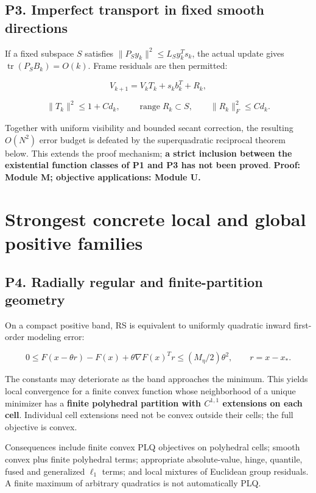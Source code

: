 \documentclass[10pt,oneside,openany]{book}
\theoremstyle{remark}\newtheorem{remark}{Remark}[chapter]
\begin{document}
\subsection{P3. Imperfect transport in fixed smooth directions}\label{p3.-imperfect-transport-in-fixed-smooth-directions}

If a fixed subspace \(S\) satisfies \(\|P_Sy_k\|^2\le L_Sy_k^Ts_k\), the actual update gives \(\operatorname{tr}(P_SB_k)=O(k)\). Frame residuals are then permitted:

\[V_{k+1}=V_kT_k+s_kb_k^T+R_k,\]

\[\|T_k\|^2\le1+Cd_k,\qquad \operatorname{range}R_k\subset S,
\qquad\|R_k\|_F^2\le Cd_k.\]

Together with uniform visibility and bounded secant correction, the resulting \(O(N^2)\) error budget is defeated by the superquadratic reciprocal theorem below. This extends the proof mechanism; \textbf{a strict inclusion between the existential function classes of P1 and P3 has not been proved}. \textbf{Proof: Module M; objective applications: Module U.}

\section{Strongest concrete local and global positive families}\label{strongest-concrete-local-and-global-positive-families}

\subsection{P4. Radially regular and finite-partition geometry}\label{p4.-radially-regular-and-finite-partition-geometry}

On a compact positive band, RS is equivalent to uniformly quadratic inward first-order modeling error:

\[
 0\le F(x-\theta r)-F(x)+\theta\nabla F(x)^Tr
 \le(M_\eta/2)\theta^2,\qquad r=x-x_*.
\]

The constants may deteriorate as the band approaches the minimum. This yields local convergence for a finite convex function whose neighborhood of a unique minimizer has a \textbf{finite polyhedral partition with \(C^{1,1}\) extensions on each cell}. Individual cell extensions need not be convex outside their cells; the full objective is convex.

Consequences include finite convex PLQ objectives on polyhedral cells; smooth convex plus finite polyhedral terms; appropriate absolute-value, hinge, quantile, fused and generalized \(\ell_1\) terms; and local mixtures of Euclidean group residuals. A finite maximum of arbitrary quadratics is not automatically PLQ.
\end{document}
